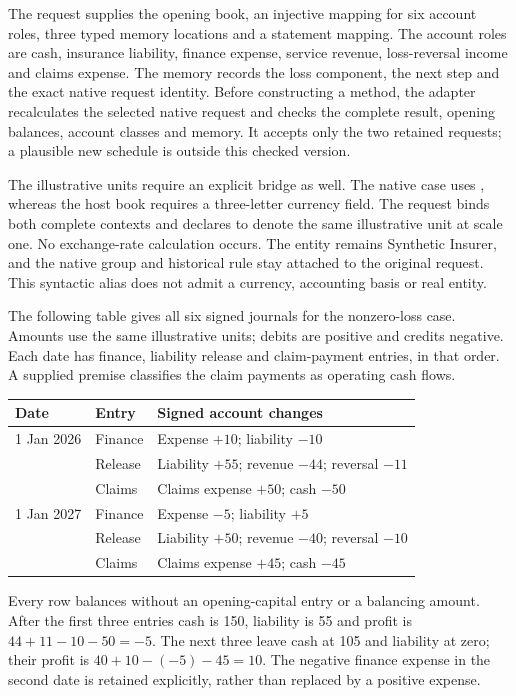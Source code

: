 The request supplies the opening book, an injective mapping for six account
roles, three typed memory locations and a statement mapping. The account roles
are cash, insurance liability, finance expense, service revenue, loss-reversal
income and claims expense. The memory records the loss component, the next
step and the exact native request identity. Before constructing a method, the
adapter recalculates the selected native request and checks the complete result,
opening balances, account classes and memory. It accepts only the two retained
requests; a plausible new schedule is outside this checked version.

The illustrative units require an explicit bridge as well. The native case
uses , whereas the host book requires a three-letter currency field.
The request binds both complete contexts and declares  to denote
the same illustrative unit at scale one. No exchange-rate calculation occurs.
The entity remains Synthetic Insurer, and the native group and historical
rule stay attached to the original request. This syntactic alias does not
admit a currency, accounting basis or real entity.

The following table gives all six signed journals for the nonzero-loss case.
Amounts use the same illustrative units; debits are positive and credits
negative. Each date has finance, liability release and claim-payment entries,
in that order. A supplied premise classifies the claim payments as operating
cash flows.
\begin{center}\small
\begin{tabular}{lll}
\toprule
Date & Entry & Signed account changes \\
\midrule
1 Jan 2026 & Finance & Expense $+10$; liability $-10$ \\
           & Release & Liability $+55$; revenue $-44$; reversal $-11$ \\
           & Claims  & Claims expense $+50$; cash $-50$ \\
1 Jan 2027 & Finance & Expense $-5$; liability $+5$ \\
           & Release & Liability $+50$; revenue $-40$; reversal $-10$ \\
           & Claims  & Claims expense $+45$; cash $-45$ \\
\bottomrule
\end{tabular}
\end{center}
Every row balances without an opening-capital entry or a balancing amount.
After the first three entries cash is 150, liability is 55 and profit is
$44+11-10-50=-5$. The next three leave cash at 105 and liability at zero;
their profit is $40+10-(-5)-45=10$. The negative finance expense in the second
date is retained explicitly, rather than replaced by a positive expense.

